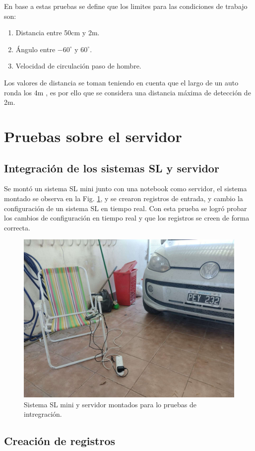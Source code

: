 En base a estas pruebas se define que los limites para las condiciones de trabajo son:
\begin{enumerate}
    \item Distancia entre 50cm y 2m.
    \item Ángulo entre $-60^\circ$ y $60^\circ$.
    \item Velocidad de circulación paso de hombre.
\end{enumerate}
Los valores de distancia se toman teniendo en cuenta que el largo de un auto ronda los 4m \cite{duran_que_2023}, es por ello que se considera una distancia máxima de detección de 2m.
\section{Pruebas sobre el servidor}

\subsection{Integración de los sistemas SL y servidor}

Se montó un sistema SL mini junto con una notebook como servidor, el sistema montado se observa en la Fig. \ref{fig:pruebas-integracion-sl-server}, y se crearon registros de entrada, y cambio la configuración de un sistema SL en tiempo real. Con esta prueba se logró probar los cambios de configuración en tiempo real y que los registros se creen de forma correcta.

\begin{figure}
    \centering
    \includegraphics[width=.5\textwidth]{imgs/pruebas-server-garage.jpg}
    \caption{Sistema SL mini y servidor montados para lo pruebas de intregración.}
    \label{fig:pruebas-integracion-sl-server}
\end{figure}


\subsection{Creación de registros}

